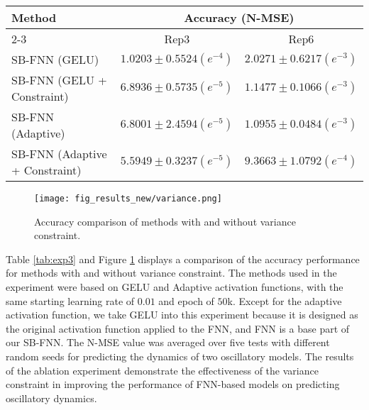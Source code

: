 \begin{table*}[!htb]
\centering
\footnotesize
\caption[Accuracy comparison with and without variance constraint] {Accuracy comparison with and without variance constraint.}
\label{tab:exp3}
\begin{tabular}{ l cc } 
\toprule
\multirow{2}{*}{Method} & 
\multicolumn{2}{c}{Accuracy (N-MSE)} \\
\cmidrule(l){2-3} 
 & Rep3 & Rep6 \\
\midrule 
\midrule
SB-FNN (GELU) & $1.0203 \pm 0.5524 (e^{-4})$ & $2.0271 \pm 0.6217 (e^{-3})$ \\
SB-FNN (GELU + Constraint) & $6.8936 \pm 0.5735 (e^{-5})$ & $1.1477 \pm 0.1066 (e^{-3})$ \\
SB-FNN (Adaptive) & $6.8001 \pm 2.4594 (e^{-5})$ & $1.0955 \pm 0.0484 (e^{-3})$ \\
SB-FNN (Adaptive + Constraint) & $5.5949 \pm 0.3237 (e^{-5})$ & $9.3663 \pm 1.0792 (e^{-4})$ \\

\bottomrule
\end{tabular}%
\end{table*}

\begin{figure}[h]
\centering
\texttt{[image: fig\_results\_new/variance.png]}
\caption[Accuracy comparison of methods with and without variance constraint] {Accuracy comparison of methods with and without variance constraint. }
\label{fig:variance}
\end{figure}

Table \ref{tab:exp3} and Figure \ref{fig:variance} displays a comparison of the accuracy performance for methods with and without variance constraint. The methods used in the experiment were based on GELU and Adaptive activation functions, with the same starting learning rate of $0.01$ and epoch of $50$k. Except for the adaptive activation function, we take GELU into this experiment because it is designed as the original activation function applied to the FNN, and FNN is a base part of our SB-FNN. The N-MSE value was averaged over five tests with different random seeds for predicting the dynamics of two oscillatory models. The results of the ablation experiment demonstrate the effectiveness of the variance constraint in improving the performance of FNN-based models on predicting oscillatory dynamics.


